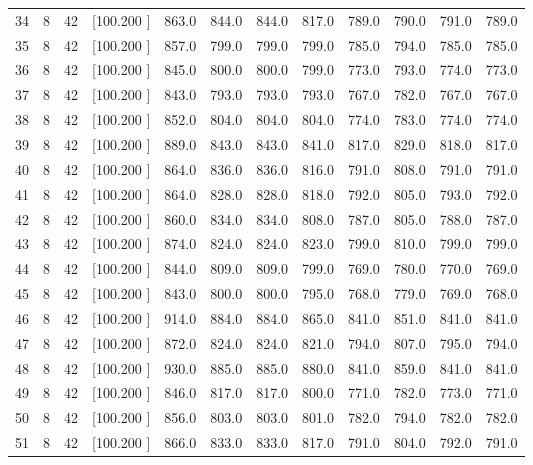 \documentclass[12pt,a4paper]{article}
\begin{document}
\begin{center}
{\begin{tabular}{r r r r r r r r r r r r}
  34&  8& 42&[100.200   ]&   863.0&   844.0&   844.0&   817.0&   789.0&   790.0&   791.0&   789.0\\[-0.02in]
  35&  8& 42&[100.200   ]&   857.0&   799.0&   799.0&   799.0&   785.0&   794.0&   785.0&   785.0\\[-0.02in]
  36&  8& 42&[100.200   ]&   845.0&   800.0&   800.0&   799.0&   773.0&   793.0&   774.0&   773.0\\[-0.02in]
  37&  8& 42&[100.200   ]&   843.0&   793.0&   793.0&   793.0&   767.0&   782.0&   767.0&   767.0\\[-0.02in]
  38&  8& 42&[100.200   ]&   852.0&   804.0&   804.0&   804.0&   774.0&   783.0&   774.0&   774.0\\[-0.02in]
  39&  8& 42&[100.200   ]&   889.0&   843.0&   843.0&   841.0&   817.0&   829.0&   818.0&   817.0\\[-0.02in]
  40&  8& 42&[100.200   ]&   864.0&   836.0&   836.0&   816.0&   791.0&   808.0&   791.0&   791.0\\[-0.02in]
  41&  8& 42&[100.200   ]&   864.0&   828.0&   828.0&   818.0&   792.0&   805.0&   793.0&   792.0\\[-0.02in]
  42&  8& 42&[100.200   ]&   860.0&   834.0&   834.0&   808.0&   787.0&   805.0&   788.0&   787.0\\[-0.02in]
  43&  8& 42&[100.200   ]&   874.0&   824.0&   824.0&   823.0&   799.0&   810.0&   799.0&   799.0\\[-0.02in]
  44&  8& 42&[100.200   ]&   844.0&   809.0&   809.0&   799.0&   769.0&   780.0&   770.0&   769.0\\[-0.02in]
  45&  8& 42&[100.200   ]&   843.0&   800.0&   800.0&   795.0&   768.0&   779.0&   769.0&   768.0\\[-0.02in]
  46&  8& 42&[100.200   ]&   914.0&   884.0&   884.0&   865.0&   841.0&   851.0&   841.0&   841.0\\[-0.02in]
  47&  8& 42&[100.200   ]&   872.0&   824.0&   824.0&   821.0&   794.0&   807.0&   795.0&   794.0\\[-0.02in]
  48&  8& 42&[100.200   ]&   930.0&   885.0&   885.0&   880.0&   841.0&   859.0&   841.0&   841.0\\[-0.02in]
  49&  8& 42&[100.200   ]&   846.0&   817.0&   817.0&   800.0&   771.0&   782.0&   773.0&   771.0\\[-0.02in]
  50&  8& 42&[100.200   ]&   856.0&   803.0&   803.0&   801.0&   782.0&   794.0&   782.0&   782.0\\[-0.02in]
  51&  8& 42&[100.200   ]&   866.0&   833.0&   833.0&   817.0&   791.0&   804.0&   792.0&   791.0\\[-0.02in]

\end{tabular}}
\end{center}
\end{document}
